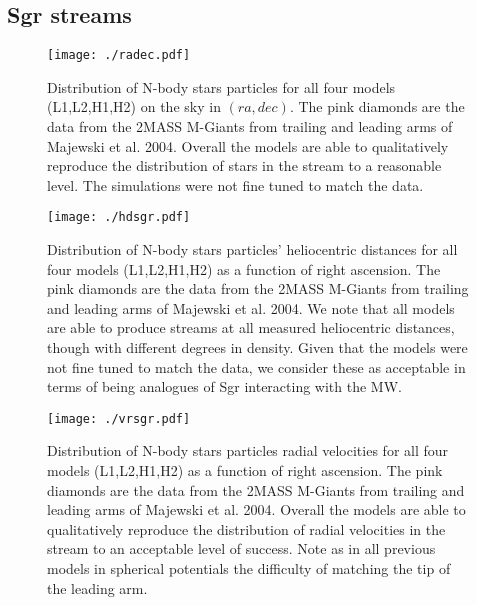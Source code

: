 \documentclass[useAMS,usenatbib]{mnras}
\begin{document}
{%

\subsection{Sgr streams}
\begin{figure}
\texttt{[image: ./radec.pdf]}
\caption[]{Distribution of N-body stars particles for all four models (L1,L2,H1,H2) on the sky in $(ra,dec)$. The pink diamonds are the data from the 2MASS M-Giants from trailing and leading arms of Majewski et al. 2004. Overall the models are able to qualitatively reproduce the distribution of stars in the stream to a reasonable level. The simulations were not fine tuned to match the data.}
\end{figure}

\begin{figure}
\texttt{[image: ./hdsgr.pdf]}
\caption[]{Distribution of N-body stars particles' heliocentric distances for all four models (L1,L2,H1,H2)  as a function of right ascension. The pink diamonds are the data from the 2MASS M-Giants from trailing and leading arms of Majewski et al. 2004. We note that all models are able to produce streams at all measured heliocentric distances, though with different degrees in density. Given that the models were not fine tuned to match the data, we consider these as acceptable in terms of being analogues of Sgr interacting with the MW.}
\end{figure}

\begin{figure}
\texttt{[image: ./vrsgr.pdf]}
\caption[]{Distribution of N-body stars particles radial velocities for all four models (L1,L2,H1,H2) as a function of right ascension. The pink diamonds are the data from the 2MASS M-Giants from trailing and leading arms of Majewski et al. 2004. Overall the models are able to qualitatively reproduce the distribution of radial velocities in the stream to an acceptable level of success. Note as in all previous models in spherical potentials  the difficulty of matching the tip of the leading arm.}
\end{figure}

}
\end{document}
